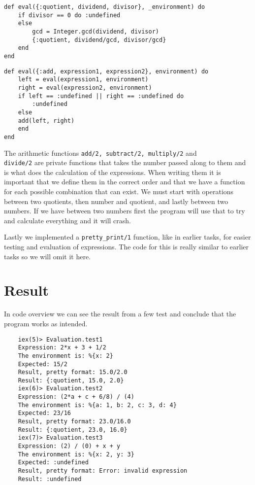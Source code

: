 \documentclass[a4paper,11pt]{article}
\newenvironment{code}{\captionsetup{type=listing}}{}
\begin{document}
\begin{code}
\label{code:evalQuot}
\begin{verbatim}
def eval({:quotient, dividend, divisor}, _environment) do
    if divisor == 0 do :undefined
    else
        gcd = Integer.gcd(dividend, divisor)
        {:quotient, dividend/gcd, divisor/gcd}
    end
end
\end{verbatim}
\end{code}
\begin{code}
\label{code:evalAdd}
\begin{verbatim}
def eval({:add, expression1, expression2}, environment) do
    left = eval(expression1, environment)
    right = eval(expression2, environment)
    if left == :undefined || right == :undefined do
        :undefined
    else
    add(left, right)
    end
end
\end{verbatim}
\end{code}

The arithmetic functions {\tt add/2, subtract/2, multiply/2} and\\ {\tt divide/2} are private functions that takes the number passed along to them and 
is what does the calculation of the expressions. When writing them it is important that we define them in the correct order and that we have a function
for each possible combination that can exist. We must start with operations between two quotients, then number and quotient, and lastly between two numbers. 
If we have between two numbers first the program will use that to try and calculate everything and it will crash. 

Lastly we implemented a {\tt pretty\_print/1} function, like in earlier tasks, for easier testing and evaluation of expressions. The code for this is really similar to 
earlier tasks so we will omit it here.


\section*{Result}
In code overview  we can see the result from a few test and conclude that the program works as intended.
\begin{code}
\label{code:classStructure}
\begin{verbatim}
    iex(5)> Evaluation.test1  
    Expression: 2*x + 3 + 1/2
    The environment is: %{x: 2}
    Expected: 15/2
    Result, pretty format: 15.0/2.0
    Result: {:quotient, 15.0, 2.0}
    iex(6)> Evaluation.test2
    Expression: (2*a + c + 6/8) / (4)
    The environment is: %{a: 1, b: 2, c: 3, d: 4}
    Expected: 23/16
    Result, pretty format: 23.0/16.0
    Result: {:quotient, 23.0, 16.0}
    iex(7)> Evaluation.test3
    Expression: (2) / (0) + x + y
    The environment is: %{x: 2, y: 3}
    Expected: :undefined
    Result, pretty format: Error: invalid expression
    Result: :undefined
\end{verbatim}
\end{code}
\end{document}
